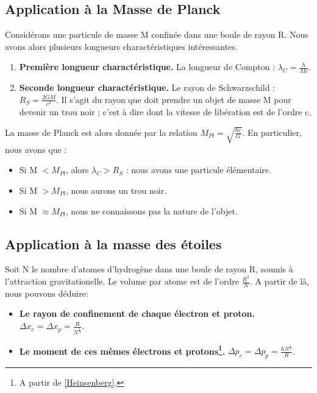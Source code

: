 \documentclass[../Notes de cours]{subfiles}
\begin{document}
\subsection{Application à la Masse de Planck}
Considérons une particule de masse M confinée dans une boule de rayon R.
Nous avons alors plusieurs longueurs charactéristiques intéressantes.
\begin{enumerate}
\item \textbf{Première longueur charactéristique.} La longueur de Compton : $\lambda_C = \frac{\hbar}{Mc}$.
\item \textbf{Seconde longueur charactéristique.} Le rayon de Schwarzschild : $R_S = \frac{2GM}{c^2}$. Il s'agit du rayon que doit prendre un objet de masse M pour devenir un trou noir ; c'est à dire dont la vitesse de libération est de l'ordre c.
\end{enumerate}

La masse de Planck est alors donnée par la relation $M_{Pl} = \sqrt{\frac{\hbar c}{G}}$. En particulier, nous avons que :
\begin{itemize}
\item Si M $< M_{Pl}$, alors $\lambda_C > R_S$ : nous avons une particule élémentaire.
\item Si M $> M_{Pl}$, nous aurons un trou noir.
\item Si M $\approx M_{Pl}$, nous ne connaissons pas la nature de l'objet.
\end{itemize}

\subsection{Application à la masse des étoiles}
Soit N le nombre d'atomes d'hydrogène dans une boule de rayon R, soumis à l'attraction gravitationelle. Le volume par atome est de l'ordre $\frac{R^3}{N}$. A partir de là, nous pouvons déduire:
\begin{itemize}
\item \textbf{Le rayon de confinement de chaque électron et proton.} $\Delta x_e = \Delta x_p = \frac{R}{N^{\frac{1}{3}}}$.
\item \textbf{Le moment de ces mêmes électrons et protons\footnote{A partir de \ref{Heinsenberg}.}.} $\Delta p_e = \Delta p_p = \frac{\hbar N^{\frac{1}{3}}}{R} $.\\
\end{itemize}
\end{document}
